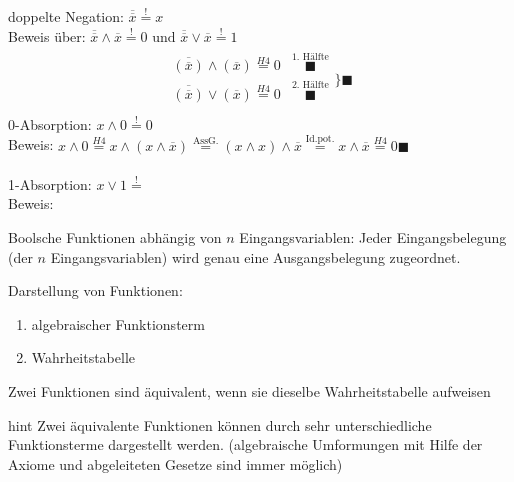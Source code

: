 \documentclass[10pt,a4paper]{scrartcl}
\begin{document}
\noindent
doppelte Negation: $ \overline{\overline{x}} \overset{!}{=} x $\\
Beweis über: $ \overline{\overline{x}} \wedge \overline{x} \overset{!}{=} 0 \text{ und }  \overline{\overline{x}} \vee \overline{x} \overset{!}{=} 1 $\\
\begin{align*}
\begin{array}{cc}
\overline{(\overline{x})} \wedge (\overline{x}) \overset{H4}{=} 0 & \overset{\text{1. Hälfte}}{\blacksquare}\\
\overline{(\overline{x})} \vee (\overline{x}) \overset{H4}{=} 0 & \overset{\text{2. Hälfte}}{\blacksquare}\\
\end{array}
\Bigg\} \blacksquare
\end{align*}
0-Absorption: $ x \wedge 0 \overset{!}{=} 0$\\
Beweis: $ x \wedge 0 \overset{H4}{=} x \wedge (x \wedge \overline{x})  \overset{\text{AssG.}}{=} (x \wedge x) \wedge \overline{x} \overset{\text{Id.pot.}}{=} x \wedge \overline{x} \overset{H4}{=} 0 \blacksquare$\\
\\
1-Absorption: $ x \vee 1 \overset{!}{=} $\\
Beweis: \\
\begin{Theorem}{}{}
Boolsche Funktionen abhängig von $ n $ Eingangsvariablen: Jeder Eingangsbelegung (der $ n $ Eingangsvariablen) wird genau eine Ausgangsbelegung zugeordnet.
\end{Theorem}

Darstellung von Funktionen:
\begin{enumerate}
	\item algebraischer Funktionsterm
	\item Wahrheitstabelle
\end{enumerate}

\begin{Theorem}{}{}
	Zwei Funktionen sind äquivalent, wenn sie dieselbe Wahrheitstabelle aufweisen
\end{Theorem}

\begin{Hint}{}{hint}
	Zwei äquivalente Funktionen können durch sehr unterschiedliche Funktionsterme dargestellt werden. (algebraische Umformungen mit Hilfe der Axiome und abgeleiteten Gesetze sind immer möglich)
\end{Hint}
\end{document}
